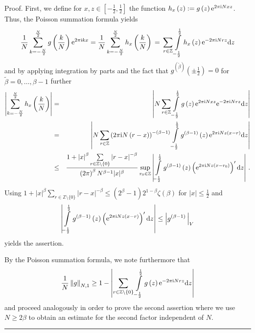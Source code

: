 \documentclass[11pt,a4paper,bibtotoc]{scrartcl}
\def\Z{\mathbb{Z}}
\def\ti{\mbox{\scriptsize{\rm i}}}
\newcommand{\eip}[1]{{\rm e}^{ 2\pi{\ti} #1}}
\newcommand{\eim}[1]{{\rm e}^{-2\pi{\ti} #1}}
\renewcommand{\d}{{\rm d}}
\renewcommand{\Box}{\hspace*{0ex} \hfill \rule{1.5ex}{1.5ex} \\ \goodbreak}
\numberwithin{equation}{section}
\numberwithin{table}{section}
\numberwithin{figure}{section}
\begin{document}
Proof. First, we define for $x,z \in \left[-\frac{1}{2},\frac{1}{2}\right]$ the
function $h_x\left(z\right):=  g\left(z\right)\eip{N x z}$.
Thus, the Poisson summation formula yields
\begin{equation*}
  \frac{1}{N}
  \sum\limits_{k=-\frac{N}{2}}^{\frac{N}{2}}
  g\left(\frac{k}{N}\right) \eip{kx} =
  \frac{1}{N}
  \sum\limits_{k=-\frac{N}{2}}^{\frac{N}{2}}
  h_x\left(\frac{k}{N}\right)\, =\, \sum_{r\in \mathbb{Z}}
  \int\limits_{-\frac{1}{2}}^{\frac{1}{2}}
  h_x\left(z\right)  \eim{N r z} \d z
\end{equation*}
and by applying integration by parts and the fact that
$g^{\left(\tilde\beta\right)}\left(\pm\frac{1}{2}\right)=0$ for $\tilde \beta=
0,\ldots,\beta-1$ further
\begin{eqnarray*}
  \left| \sum\limits_{k=-\frac{N}{2}}^{\frac{N}{2}}
  h_x\left(\frac{k}{N}\right) \right|
  &=&\left| N \sum_{r\in \mathbb{Z}}
  \int\limits_{-\frac{1}{2}}^{\frac{1}{2}} g\left(z\right) \eip{N x z}
  \eim{N r z}  \d z \right |\\
  &=&
  \left| N \sum_{r\in \mathbb{Z}} \left(2\pi {\rm i} N
      \left(r-x\right)\right)^{-\left(\beta-1\right)} 
    \int\limits_{-\frac{1}{2}}^{\frac{1}{2}}
    g^{\left(\beta-1\right)}\left(z\right)  \eip{N z \left(x - r\right)}
    \d z \right |\\
  &\le&
  \frac{1+\left|x\right|^{\beta} \sum\limits_{r\in \Z\setminus\{0\}}
    \left|r-x\right|^{-\beta}}
  {\left(2\pi\right)^{\beta} N^{\beta-1} |x|^{\beta}} \sup_{r_0\in\Z}
  \left | \int\limits_{-\frac{1}{2}}^{\frac{1}{2}}
    g^{\left(\beta-1\right)}\left(z\right)  \left( \eip{N z \left(x -
          r_0\right)} \right)' 
    \d z \right |\,.
\end{eqnarray*}
Using $1+\left|x\right|^{\beta} \sum_{r\in \Z\setminus\{0\}}
\left|r-x\right|^{-\beta} \le (2^{\beta}-1)2^{1-\beta}\zeta(\beta)$ for
$|x|\le\frac{1}{2}$ and
\begin{equation*}
  \left |
   \int\limits_{-\frac{1}{2}}^{\frac{1}{2}}
   g^{\left(\beta-1\right)}\left(z\right)  \left( \eip{N z \left(x - r\right)}
   \right)' \d z \right |
 \le
 \left|g^{\left(\beta-1\right)}\,\right|_V
\end{equation*}
yields the assertion.

By the Poisson summation formula, we note furthermore that
\begin{equation*}
  \frac{1}{N} \left\|g\right\|_{N,1}
  \ge 1-\left|\sum\limits_{r\in\mathbb{Z}\setminus\left\{0\right\}}
  \int\limits_{-\frac{1}{2}}^{\frac{1}{2}} g\left(z\right) \eim{Nrz}\d
  z\right|
\end{equation*}
and proceed analogously in order to prove the second assertion where we use
$N\ge 2\beta$ to obtain an estimate for the second factor independent of
$N$. \Box
\end{document}
